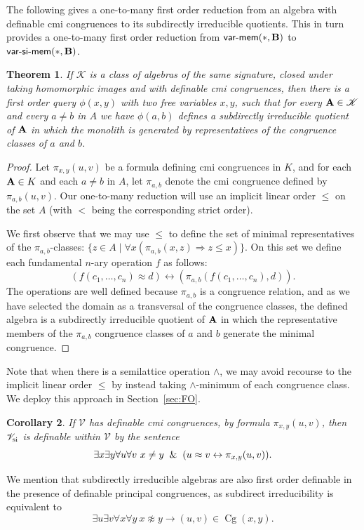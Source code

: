 \documentclass[10pt,a4paper]{amsart}
\theoremstyle{plain}
\newtheorem{thm}{Theorem}[section]
\newtheorem{cor}[thm]{Corollary}
\theoremstyle{definition}
\newcommand{\varmem}{\textsf{var-mem}}
\newcommand{\varsimem}{\textsf{var-si-mem}}
\newcommand{\Cg}{\operatorname{Cg}}
\begin{document}
The following gives a one-to-many first order reduction from an algebra with definable cmi congruences to its subdirectly irreducible quotients.  This in turn provides a one-to-many first order reduction from $\varmem(*,{\bf B})$ to $\varsimem(*,{\bf B})$.
\begin{thm}\label{thm:fodecomp}
If $\mathscr{K}$ is a class of algebras of the same signature, closed under taking homomorphic images and with definable cmi congruences, then there is a first order query $\phi(x,y)$ with two free variables $x,y$, such that for every ${\bf A}\in \mathscr{K}$ and every $a\neq b$ in $A$ we have $\phi(a,b)$ defines a subdirectly irreducible quotient of ${\bf A}$ in which the monolith  is generated by representatives of the congruence classes of $a$ and $b$.
\end{thm}
\begin{proof}
Let $\pi_{x,y}(u,v)$ be a formula defining cmi congruences in $K$, and for each ${\bf A}\in K$ and each $a\neq b$ in $A$, let $\pi_{a,b}$ denote the cmi congruence defined by $\pi_{a,b}(u,v)$.  Our one-to-many reduction will  use an implicit linear order $\leq$ on the set $A$ (with $<$ being the corresponding strict order).   

We first observe that we may use $\leq$ to define the set of minimal representatives of the $\pi_{a,b}$-classes: $\{z\in A\mid \forall x (\pi_{a,b}(x,z)\Rightarrow z\leq x)\}$.  On this set we define each fundamental $n$-ary operation $f$ as follows:
\[
(f(c_1,\dots,c_n)\approx d)\leftrightarrow (\pi_{a,b}(f(c_1,\dots,c_n),d)).
\]
The operations are well defined because $\pi_{a,b}$ is a congruence relation, and as we have selected the domain as a transversal of the congruence classes, the defined algebra is a subdirectly irreducible quotient of ${\bf A}$ in which the representative members of the $\pi_{a,b}$ congruence classes of $a$ and $b$ generate the minimal congruence.
\end{proof}
Note that when there is a semilattice operation $\wedge$, we may avoid recourse to the implicit linear order $\leq$ by instead taking $\wedge$-minimum of each congruence class.  We deploy this approach in Section~\ref{sec:FO}.
\begin{cor}
If $\mathscr{V}$ has definable cmi congruences, by formula $\pi_{x,y}(u,v)$, then~$\mathscr{V}_{\rm si}$ is definable within $\mathscr{V}$ by the sentence 
\[
\exists x\exists y\forall u\forall v\ x\neq y\And (u\approx v\leftrightarrow \pi_{x,y}(u,v)).
\]
\end{cor}
We mention that subdirectly irreducible algebras are also first order definable in the presence of definable principal congruences, as subdirect irreducibility is equivalent to 
\[
\exists u\exists v \forall x\forall y\  x\not\approx y\rightarrow (u,v)\in \Cg(x,y).
\]
\end{document}
